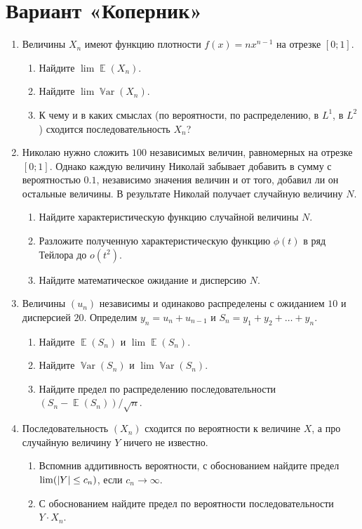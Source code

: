 \documentclass[12pt]{article}
\DeclareMathOperator{\Var}{\mathbb{V}ar}
\let\P\relax
\DeclareMathOperator{\P}{\mathbb{P}}
\DeclarePairedDelimiter{\abs}{\lvert}{\rvert}
\DeclareMathOperator{\E}{\mathbb{E}}
\begin{document}
\section*{Вариант «Коперник»}

\begin{enumerate}
    \item Величины $X_n$ имеют функцию плотности $f(x) = n x^{n-1}$ на отрезке $[0;1]$.
    \begin{enumerate}
        \item Найдите $\lim \E(X_n)$.
        \item Найдите $\lim \Var(X_n)$.
        \item К чему и в каких смыслах (по вероятности, по распределению, в $L^1$, в $L^2$) сходится последовательность $X_n$?
    \end{enumerate}

    \item Николаю нужно сложить $100$ независимых величин, равномерных на отрезке $[0;1]$.
    Однако каждую величину Николай забывает добавить в сумму с вероятностью $0.1$, независимо значения величин и от того, добавил ли он остальные величины. 
    В результате Николай получает случайную величину $N$.

    \begin{enumerate}
        \item Найдите характеристическую функцию случайной величины $N$.
        \item Разложите полученную характеристическую функцию $\phi(t)$ в ряд Тейлора до $o(t^2)$.
        \item Найдите математическое ожидание и дисперсию $N$.
    \end{enumerate}


    \item Величины $(u_n)$ независимы и одинаково распределены с ожиданием $10$ и дисперсией $20$.
    Определим $y_n = u_n + u_{n-1}$ и $S_n = y_1 + y_2 + \dots + y_n$.

    \begin{enumerate}
        \item Найдите $\E(S_n)$ и $\lim \E(S_n)$.
        \item Найдите $\Var(S_n)$ и $\lim \Var(S_n)$.
        \item Найдите предел по распределению последовательности $(S_n - \E(S_n))/\sqrt{n}$.
    \end{enumerate}

    \item Последовательность $(X_n)$ сходится по вероятности к величине $X$, а про случайную величину $Y$ ничего не известно. 
    \begin{enumerate}
        \item Вспомнив аддитивность вероятности, с обоснованием найдите предел $\lim \P(\abs{Y} \leq c_n)$, если $c_n \to \infty$. 
        \item С обоснованием найдите предел по вероятности последовательности $Y \cdot X_n$. 
    \end{enumerate}


\end{enumerate}
\end{document}
